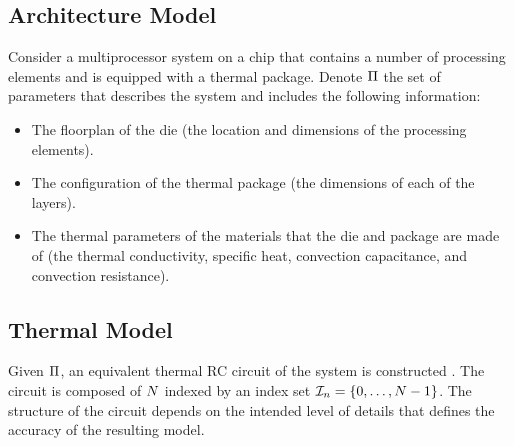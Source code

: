 \subsection{Architecture Model}
Consider a multiprocessor system on a chip that contains a number of processing elements and is equipped with a thermal package. Denote $\Pi$ the set of parameters that describes the system and includes the following information:
\begin{itemize}
  \item The floorplan of the die (the location and dimensions of the processing elements).
  \item The configuration of the thermal package (the dimensions of each of the layers).
  \item The thermal parameters of the materials that the die and package are made of (the thermal conductivity, specific heat, convection capacitance, and convection resistance).
\end{itemize}

\subsection{Thermal Model} 
Given $\Pi$, an equivalent thermal RC circuit of the system is constructed \cite{kreith2000}. The circuit is composed of $N$  indexed by an index set $\mathcal{I}_n = \{ 0, \dots, N - 1 \}$. The structure of the circuit depends on the intended level of details that defines the accuracy of the resulting model.

